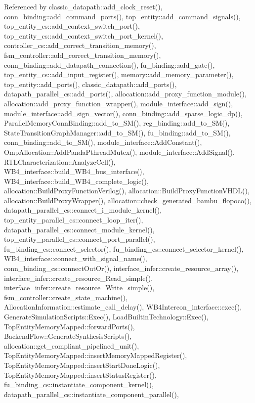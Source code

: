 Referenced by classic\+\_\+datapath\+::add\+\_\+clock\+\_\+reset(), conn\+\_\+binding\+::add\+\_\+command\+\_\+ports(), top\+\_\+entity\+::add\+\_\+command\+\_\+signals(), top\+\_\+entity\+\_\+cs\+::add\+\_\+context\+\_\+switch\+\_\+port(), top\+\_\+entity\+\_\+cs\+::add\+\_\+context\+\_\+switch\+\_\+port\+\_\+kernel(), controller\+\_\+cs\+::add\+\_\+correct\+\_\+transition\+\_\+memory(), fsm\+\_\+controller\+::add\+\_\+correct\+\_\+transition\+\_\+memory(), conn\+\_\+binding\+::add\+\_\+datapath\+\_\+connection(), fu\+\_\+binding\+::add\+\_\+gate(), top\+\_\+entity\+\_\+cs\+::add\+\_\+input\+\_\+register(), memory\+::add\+\_\+memory\+\_\+parameter(), top\+\_\+entity\+::add\+\_\+ports(), classic\+\_\+datapath\+::add\+\_\+ports(), datapath\+\_\+parallel\+\_\+cs\+::add\+\_\+ports(), allocation\+::add\+\_\+proxy\+\_\+function\+\_\+module(), allocation\+::add\+\_\+proxy\+\_\+function\+\_\+wrapper(), module\+\_\+interface\+::add\+\_\+sign(), module\+\_\+interface\+::add\+\_\+sign\+\_\+vector(), conn\+\_\+binding\+::add\+\_\+sparse\+\_\+logic\+\_\+dp(), Parallel\+Memory\+Conn\+Binding\+::add\+\_\+to\+\_\+\+S\+M(), reg\+\_\+binding\+::add\+\_\+to\+\_\+\+S\+M(), State\+Transition\+Graph\+Manager\+::add\+\_\+to\+\_\+\+S\+M(), fu\+\_\+binding\+::add\+\_\+to\+\_\+\+S\+M(), conn\+\_\+binding\+::add\+\_\+to\+\_\+\+S\+M(), module\+\_\+interface\+::\+Add\+Constant(), Omp\+Allocation\+::\+Add\+Panda\+Pthread\+Mutex(), module\+\_\+interface\+::\+Add\+Signal(), R\+T\+L\+Characterization\+::\+Analyze\+Cell(), W\+B4\+\_\+interface\+::build\+\_\+\+W\+B4\+\_\+bus\+\_\+interface(), W\+B4\+\_\+interface\+::build\+\_\+\+W\+B4\+\_\+complete\+\_\+logic(), allocation\+::\+Build\+Proxy\+Function\+Verilog(), allocation\+::\+Build\+Proxy\+Function\+V\+H\+D\+L(), allocation\+::\+Build\+Proxy\+Wrapper(), allocation\+::check\+\_\+generated\+\_\+bambu\+\_\+flopoco(), datapath\+\_\+parallel\+\_\+cs\+::connect\+\_\+i\+\_\+module\+\_\+kernel(), top\+\_\+entity\+\_\+parallel\+\_\+cs\+::connect\+\_\+loop\+\_\+iter(), datapath\+\_\+parallel\+\_\+cs\+::connect\+\_\+module\+\_\+kernel(), top\+\_\+entity\+\_\+parallel\+\_\+cs\+::connect\+\_\+port\+\_\+parallel(), fu\+\_\+binding\+\_\+cs\+::connect\+\_\+selector(), fu\+\_\+binding\+\_\+cs\+::connect\+\_\+selector\+\_\+kernel(), W\+B4\+\_\+interface\+::connect\+\_\+with\+\_\+signal\+\_\+name(), conn\+\_\+binding\+\_\+cs\+::connect\+Out\+Or(), interface\+\_\+infer\+::create\+\_\+resource\+\_\+array(), interface\+\_\+infer\+::create\+\_\+resource\+\_\+\+Read\+\_\+simple(), interface\+\_\+infer\+::create\+\_\+resource\+\_\+\+Write\+\_\+simple(), fsm\+\_\+controller\+::create\+\_\+state\+\_\+machine(), Allocation\+Information\+::estimate\+\_\+call\+\_\+delay(), W\+B4\+Intercon\+\_\+interface\+::exec(), Generate\+Simulation\+Scripts\+::\+Exec(), Load\+Builtin\+Technology\+::\+Exec(), Top\+Entity\+Memory\+Mapped\+::forward\+Ports(), Backend\+Flow\+::\+Generate\+Synthesis\+Scripts(), allocation\+::get\+\_\+compliant\+\_\+pipelined\+\_\+unit(), Top\+Entity\+Memory\+Mapped\+::insert\+Memory\+Mapped\+Register(), Top\+Entity\+Memory\+Mapped\+::insert\+Start\+Done\+Logic(), Top\+Entity\+Memory\+Mapped\+::insert\+Status\+Register(), fu\+\_\+binding\+\_\+cs\+::instantiate\+\_\+component\+\_\+kernel(), datapath\+\_\+parallel\+\_\+cs\+::instantiate\+\_\+component\+\_\+parallel(), 